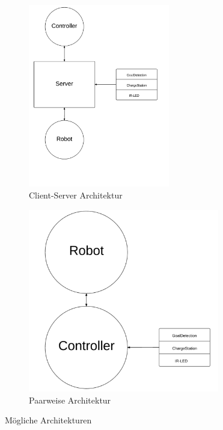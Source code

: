 \begin{figure}[h!]
	\centering
	\begin{subfigure}{0.4\textwidth}
		\includegraphics[height = 8cm]{images/client-server_architektur.pdf}
		\caption{Client-Server Architektur}
		\label{fig:client-server_architektur}
	\end{subfigure}
	\quad
	\begin{subfigure}{0.4\textwidth}
		\includegraphics[height = 8cm]{images/paarweise_architektur.pdf}
		\caption{Paarweise Architektur}
		\label{fig:paarweise_architektur}
	\end{subfigure}
	
	\caption{Mögliche Architekturen}
\end{figure}


